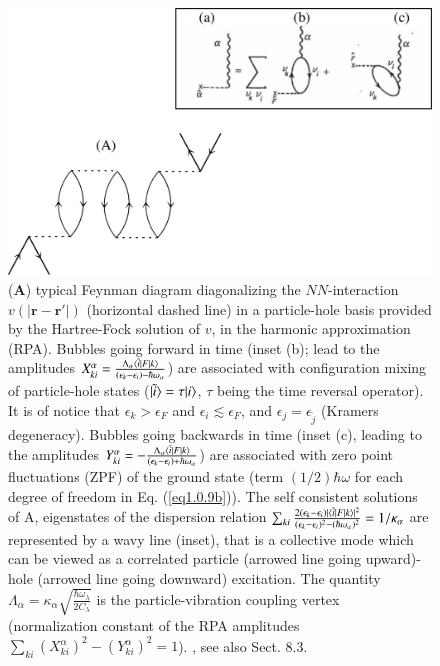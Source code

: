 \begin{figure}
	\centerline {
		\includegraphics*[width=12cm]{introduccion/figs/figpreface7}
	}
	\caption{(\textbf{A}) typical Feynman diagram diagonalizing the $NN$-interaction $v(|\mathbf r-\mathbf r'|)$ (horizontal dashed line) in a particle-hole basis provided by the Hartree-Fock solution of $v$, in the harmonic approximation (RPA). Bubbles going forward in time (inset (b); lead to the amplitudes $X^\alpha_{ki}=\frac{\Lambda_\alpha\langle {\tilde i|F|k} \rangle}{(\epsilon_k-\epsilon_i)-\hbar\omega_\alpha}$) are associated with configuration mixing of particle-hole states  ($|{\tilde i} \rangle=\tau|{i} \rangle$,  $\tau$ being the time reversal operator). It is of notice that $\epsilon_k>\epsilon_F$ and $\epsilon_i\lesssim\epsilon_F$, and $\epsilon_j=\epsilon_{\widetilde j}$ (Kramers degeneracy). Bubbles going backwards in time (inset (c), leading to the amplitudes $Y^\alpha_{ki}=-\frac{\Lambda_\alpha\langle {\tilde i|F|k} \rangle}{(\epsilon_k-\epsilon_i)+\hbar\omega_\alpha}$) are associated with zero point  fluctuations (ZPF) of the ground state (term $(1/2)\hbar\omega$ for each degree of freedom in Eq. (\ref{eq1.0.9b})). The self consistent solutions of A, eigenstates of the dispersion relation $\sum_{ki}\frac{2(\epsilon_k-\epsilon_i)|\langle {\tilde i|F|k} \rangle|^2}{(\epsilon_k-\epsilon_i)^2-(\hbar\omega_\alpha)^2}=1/\kappa_\alpha$ are represented by a wavy line (inset), that is a collective mode which can be viewed as a correlated particle (arrowed line going upward)- hole (arrowed line going downward) excitation. The quantity $\Lambda_\alpha=\kappa_\alpha\sqrt{\frac{\hbar\omega_\lambda}{2C_\lambda}}$ is the particle-vibration coupling vertex (normalization constant of the RPA amplitudes $\sum_{ki}\left(X^\alpha_{ki}\right)^2-\left(Y^\alpha_{ki}\right)^2=1$). \cite{Bohm:51,Bohm:53}, see also \cite{Brink:05} Sect. 8.3.}
	\label{fig1.0.7}
\end{figure}

